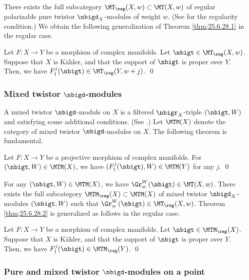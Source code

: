 \documentclass[a4,10pt]{article}
\begin{document}
There exists the full subcategory
$\MT_{\reg}(X,w)\subset \MT(X,w)$ of
regular polarizable pure twistor $\nbigd_X$-modules of weight $w$.
(See \cite{Sabbah-pure-twistor,mochi2} for
the regularity condition.)
We obtain the following generalization of 
Theorem \ref{thm;25.6.28.1}
in the regular case.
\begin{thm}
Let $F:X\to Y$ be a morphism of complex manifolds.
Let $\nbigt\in\MT_{\reg}(X,w)$.
Suppose that $X$ is K\"ahler,
and that the support of $\nbigt$ is proper over $Y$.
Then, we have $F^j_{\dagger}(\nbigt)\in \MT_{\reg}(Y,w+j)$.
\hfill\qed
\end{thm}

\subsubsection{Mixed twistor $\nbigd$-modules}

A mixed twistor $\nbigd$-module on $X$
is a filtered $\nbigr_X$-triple $(\nbigt,W)$
and satisfying some additional conditions.
(See \cite[\S7]{Mochizuki-MTM}.)
Let $\MTM(X)$ denote the category of
mixed twistor $\nbigd$-modules on $X$.
The following theorem is fundamental.
\begin{thm}
\label{thm;25.6.28.2}
Let $F:X\to Y$ be a projective morphism of complex manifolds.
For $(\nbigt,W)\in\MTM(X)$,
we have $(F_{\dagger}^j(\nbigt),W)\in \MTM(Y)$ for any $j$.
\hfill\qed
\end{thm}

For any $(\nbigt,W)\in\MTM(X)$,
we have $\Gr^W_w(\nbigt)\in\MT(X,w)$.
There exists the full subcategory
$\MTM_{\reg}(X)\subset \MTM(X)$ of
mixed twistor $\nbigd_X$-modules $(\nbigt,W)$
such that
$\Gr^W_w(\nbigt)\in\MT_{\reg}(X,w)$.
Theorem \ref{thm;25.6.28.2}
is generalized as follows in the regular case.
\begin{thm}
Let $F:X\to Y$ be a morphism of complex manifolds.
Let $\nbigt\in\MTM_{\reg}(X)$.
Suppose that $X$ is K\"ahler,
and that the support of $\nbigt$ is proper over $Y$.
Then, we have $F^j_{\dagger}(\nbigt)\in \MTM_{\reg}(Y)$.
\hfill\qed
\end{thm}

\subsubsection{Pure and mixed twistor $\nbigd$-modules on a point}
\end{document}
